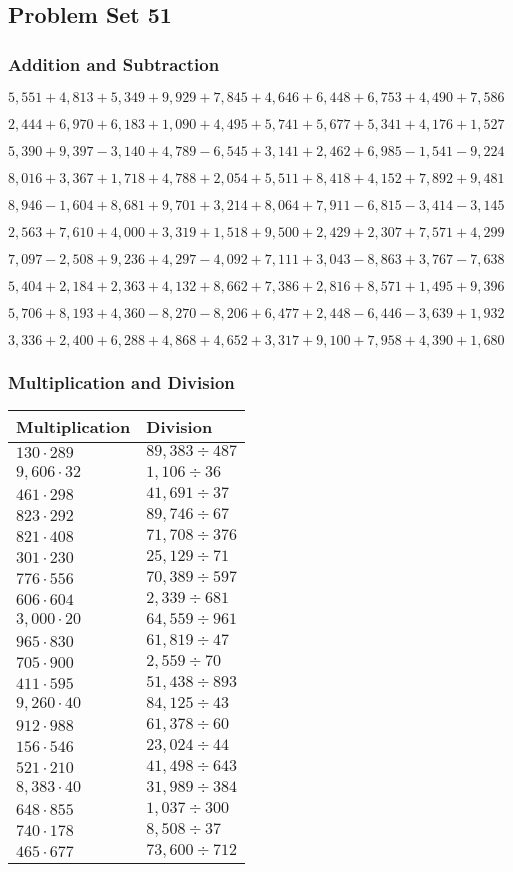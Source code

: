 \hypertarget{problem-set-51-2}{%
\subsection{Problem Set 51}\label{problem-set-51-2}}

\hypertarget{addition-and-subtraction-213}{%
\subsubsection{Addition and
Subtraction}\label{addition-and-subtraction-213}}

\(5,551+4,813+5,349+9,929+7,845+4,646+6,448+6,753+4,490+ 7,586\)

\(2,444+6,970+6,183+1,090+4,495+5,741+5,677+5,341+4,176+1,527\)

\(5,390+9,397-3,140+4,789-6,545+3,141+2,462+6,985-1,541-9,224\)

\(8,016+3,367+1,718+4,788+2,054+5,511+8,418+4,152+7,892+9,481\)

\(8,946-1,604+8,681+9,701+3,214+8,064+7,911-6,815-3,414-3,145\)

\(2,563+7,610+4,000+3,319+1,518+9,500+2,429+2,307+7,571+4,299\)

\(7,097-2,508+9,236+4,297-4,092+7,111+3,043-8,863+3,767-7,638\)

\(5,404+2,184+2,363+4,132+8,662+7,386+2,816+8,571+1,495+9,396\)

\(5,706+8,193+4,360-8,270-8,206+6,477+2,448-6,446-3,639+1,932\)

\(3,336+2,400+6,288+4,868+4,652+3,317+9,100+7,958+4,390+1,680\)

\hypertarget{multiplication-and-division-212}{%
\subsubsection{Multiplication and
Division}\label{multiplication-and-division-212}}

\begin{longtable}[]{@{}ll@{}}
\toprule
Multiplication & Division\tabularnewline
\midrule
\endhead
\(130\cdot289\) & \(89,383÷487\)\tabularnewline
\(9,606\cdot32\) & \(1,106÷36\)\tabularnewline
\(461\cdot298\) & \(41,691÷37\)\tabularnewline
\(823\cdot292\) & \(89,746÷67\)\tabularnewline
\(821\cdot408\) & \(71,708÷376\)\tabularnewline
\(301\cdot230\) & \(25,129÷71\)\tabularnewline
\(776\cdot556\) & \(70,389÷597\)\tabularnewline
\(606\cdot604\) & \(2,339÷681\)\tabularnewline
\(3,000\cdot20\) & \(64,559÷961\)\tabularnewline
\(965\cdot830\) & \(61,819÷47\)\tabularnewline
\(705\cdot900\) & \(2,559÷70\)\tabularnewline
\(411\cdot595\) & \(51,438÷893\)\tabularnewline
\(9,260\cdot40\) & \(84,125÷43\)\tabularnewline
\(912\cdot988\) & \(61,378÷60\)\tabularnewline
\(156\cdot546\) & \(23,024÷44\)\tabularnewline
\(521\cdot210\) & \(41,498÷643\)\tabularnewline
\(8,383\cdot40\) & \(31,989÷384\)\tabularnewline
\(648\cdot855\) & \(1,037÷300\)\tabularnewline
\(740\cdot178\) & \(8,508÷37\)\tabularnewline
\(465\cdot677\) & \(73,600÷712\)\tabularnewline
\bottomrule
\end{longtable}

